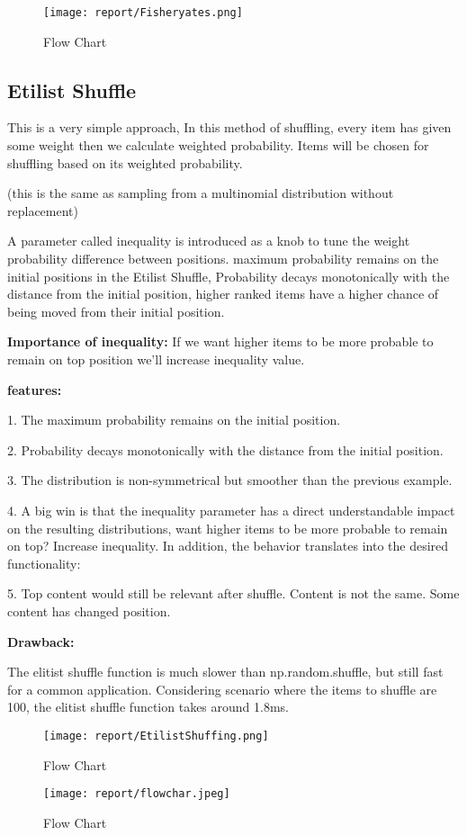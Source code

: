 \begin{figure}
\texttt{[image: report/Fisheryates.png]}
\caption{Flow Chart}
\label{chap0Fig:2}
\end{figure}





\subsection{Etilist Shuffle}
This is a very simple approach, In this method of shuffling, every item has given some weight then we calculate weighted probability. Items will be chosen for shuffling based on its weighted probability.

(this is the same as sampling from a multinomial distribution without replacement)

A parameter called inequality is introduced as a knob to tune the weight probability difference between positions.
maximum probability remains on the initial positions in the Etilist Shuffle, Probability decays monotonically with the distance from the initial position, higher ranked items have a higher chance of  being moved from their initial position.

\textbf{Importance of inequality:} If we want higher items to be more probable to remain on top position we'll increase inequality value.

\textbf{features: } 

1. The maximum probability remains on the initial position.

2. Probability decays monotonically with the distance from the initial position.

3. The distribution is non-symmetrical but smoother than the previous example.

4. A big win is that the inequality parameter has a direct understandable impact on the resulting distributions, want higher items to be more probable to remain on top? Increase inequality. In addition, the behavior translates into the desired functionality:

5. Top content would still be relevant after shuffle.
Content is not the same.
Some content has changed position.

\textbf{Drawback:}

The elitist shuffle function is much slower than np.random.shuffle, but still fast for a common application. Considering scenario where the items to shuffle are 100, the elitist shuffle function takes around 1.8ms.



\begin{figure}
\texttt{[image: report/EtilistShuffing.png]}
\caption{Flow Chart}
\label{chap0Fig:2}
\end{figure}



\begin{figure}
\texttt{[image: report/flowchar.jpeg]}
\caption{Flow Chart}
\label{chap0Fig:2}
\end{figure}